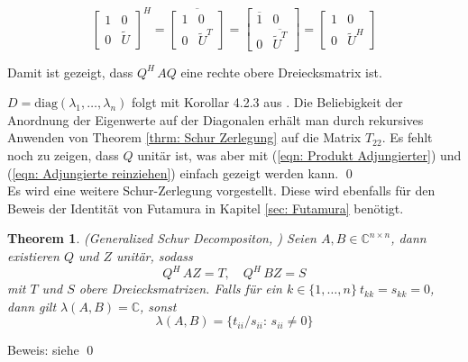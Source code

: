 \documentclass[a4paper,12pt]{report}
\newcommand{\C}{\mathbb C}
\newcommand{\diag}{\text{diag}}
\newcommand{\1}{\mathds{1}}
\theoremstyle{plain} %
\newtheorem{theorem}{Theorem}
\theoremstyle{definition} %
\theoremstyle{remark}
\begin{document}
            \begin{equation}
            \label{eqn: Adjungierte reinziehen}
                  \begin{bmatrix}
                        1&0\\
                        0&\widetilde U
                  \end{bmatrix}^H = \overline{\begin{bmatrix}
                        1&0\\
                        0&\widetilde U^T
                  \end{bmatrix}} = \begin{bmatrix}
                        \overline{1}&0\\
                        0&\overline{\widetilde U^T}
                  \end{bmatrix} = \begin{bmatrix}
                        1&0\\
                        0&\widetilde U^H
                  \end{bmatrix}
            \end{equation}

            Damit ist gezeigt, dass $Q^H\,AQ$ eine rechte obere Dreiecksmatrix ist.

            $D = \diag(\lambda_1,\dots,\lambda_n)$ folgt mit Korollar 4.2.3 aus \cite[S. 80]{LinAlgWerner}.
            Die Beliebigkeit der Anordnung der Eigenwerte auf der Diagonalen erhält man durch rekursives Anwenden von Theorem \ref{thrm: Schur Zerlegung} auf die Matrix $T_{22}$.
            Es fehlt noch zu zeigen, dass $Q$ unitär ist, was aber mit (\ref{eqn: Produkt Adjungierter}) und (\ref{eqn: Adjungierte reinziehen}) einfach gezeigt werden kann. \qed\\

            Es wird eine weitere Schur-Zerlegung vorgestellt. Diese wird ebenfalls für den Beweis der Identität von Futamura in Kapitel \ref{sec: Futamura} benötigt.
            \begin{theorem}(Generalized Schur Decompositon, \cite[S. 377]{matrixGolub})
                  \label{thrm: allg Schur Zerlegung}
                  Seien $A, B \in \C^{n\times n}$, dann existieren $Q$ und $Z$ unitär, sodass
                  \begin{equation}
                        \label{eqn: allg Schur_Resultat}
                        Q^H\,AZ = T,\quad Q^H\, BZ = S
                  \end{equation}
                  mit $T$ und $S$ obere Dreiecksmatrizen.
                  Falls für ein $k\in \{1,\dots, n\}\ t_{kk}=s_{kk}=0$, dann gilt $\lambda(A, B) = \C$, sonst
                  \begin{equation}
                        \label{eqn: EW Pencil nach Schur}
                        \lambda(A, B) = \{t_{ii}/s_{ii}:\, s_{ii}\ne 0\}
                  \end{equation}
            \end{theorem}
            Beweis: siehe \cite[S. 377]{matrixGolub}\qed
      
\end{document}
